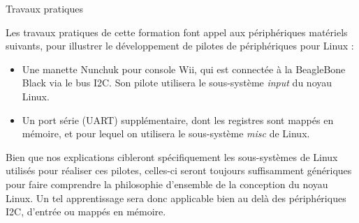 \documentclass[a4paper,12pt,obeyspaces,spaces,hyphens]{article}
\begin{document}
\feshowtitle

\feshowinfo


\feagendaonecolumn
{Travaux pratiques}
{
  Les travaux pratiques de cette formation font appel aux périphériques
  matériels suivants, pour illustrer le développement de pilotes de
  périphériques pour Linux :

  \begin{itemize}
  \item Une manette Nunchuk pour console Wii, qui est connectée à la
    BeagleBone Black via le bus I2C. Son pilote utilisera le
    sous-système {\em input} du noyau Linux.
  \item Un port série (UART) supplémentaire, dont les registres sont
    mappés en mémoire, et pour lequel on utilisera le sous-système {\em
    misc} de Linux.
  \end{itemize}

  Bien que nos explications cibleront spécifiquement les sous-systèmes
  de Linux utilisés pour réaliser ces pilotes, celles-ci seront toujours
  suffisamment génériques pour faire comprendre la philosophie
  d'ensemble de la conception du noyau Linux. Un tel apprentissage
  sera donc applicable bien au delà des périphériques I2C, d'entrée ou
  mappés en mémoire.
}

\onlineagenda
\end{document}
